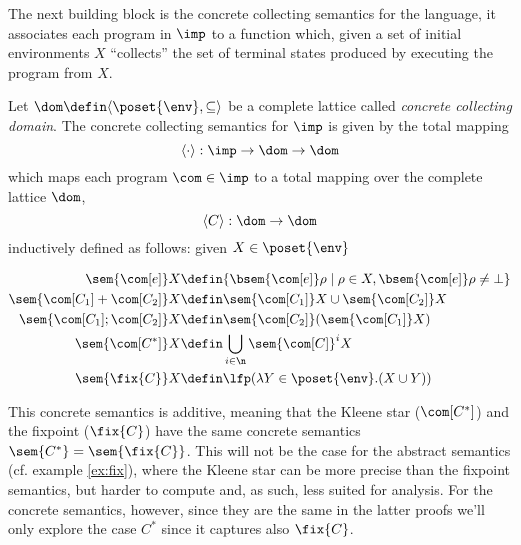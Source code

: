 The next building block is the concrete collecting semantics for the
language, it associates each program in \(\imp\) to a function which,
given a set of initial environments \(X\) ``collects'' the set of
terminal states produced by executing the program from \(X\).

\begin{definition}
  Let \(\dom \defin \langle \poset{\env} , \subseteq \rangle\) be a
  complete lattice called \emph{concrete collecting domain}. The
  concrete collecting semantics for \(\imp\) is given by the total
  mapping \[\langle \cdot \rangle : \imp \to \dom \to \dom\] which
  maps each program \(\com \in \imp\) to a total mapping over the
  complete lattice \(\dom\), \[\langle C \rangle : \dom \to \dom\]
  inductively defined as follows: given \(X \in \poset{\env}\)

  \begin{align*}
    \sem{\com[e]} X & \defin \{\bsem{\com[e]} \rho \mid \rho \in X,
    \bsem{\com[e]} \rho \neq \bot\} \\
    \sem{\com[C_1] + \com[C_2]} X & \defin \sem{\com[C_1]} X \cup \sem{\com[C_2]} X \\
    \sem{\com[C_1] ; \com[C_2]} X & \defin \sem{\com[C_2]}(\sem{\com[C_1]} X) \\
    \sem{\com[C^*]} X & \defin \bigcup_{i \in \n} \sem{\com[C]}^i X \\
    \sem{\fix{C}} X & \defin \lfp(\lambda Y \in\poset{\env} . (X \cup Y))
  \end{align*}
\end{definition}

This concrete semantics is additive, meaning that the Kleene star
(\(\com[C^*]\)) and the fixpoint (\(\fix{C}\)) have the same concrete
semantics \(\sem{C^*} = \sem{\fix{C}}\).  This will not be the case
for the abstract semantics (cf. example \ref{ex:fix}), where the
Kleene star can be more precise than the fixpoint semantics, but
harder to compute and, as such, less suited for analysis. For the
concrete semantics, however, since they are the same in the latter
proofs we'll only explore the case \(C^*\) since it captures also
\(\fix{C}\).


